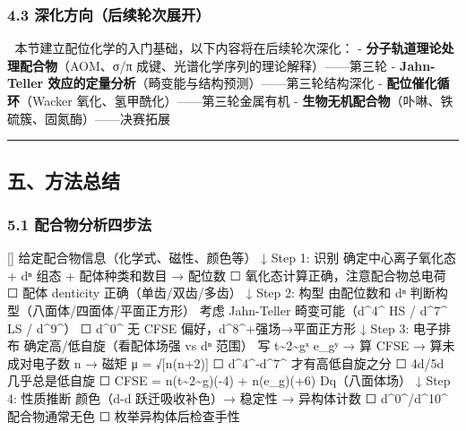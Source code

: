 \documentclass[a4paper,11pt]{ctexart}
\newenvironment{Shaded}{}{}
\newenvironment{Highlighting}{}{}
\newcommand{\NormalTok}[1]{#1}
\begin{document}
\subsubsection{4.3 深化方向（后续轮次展开）}\label{ux6df1ux5316ux65b9ux5411ux540eux7eedux8f6eux6b21ux5c55ux5f00}

🔷 本节建立配位化学的入门基础，以下内容将在后续轮次深化：
- \textbf{分子轨道理论处理配合物}（AOM、σ/π 成键、光谱化学序列的理论解释）------第三轮
- \textbf{Jahn-Teller 效应的定量分析}（畸变能与结构预测）------第三轮结构深化
- \textbf{配位催化循环}（Wacker 氧化、氢甲酰化）------第三轮金属有机
- \textbf{生物无机配合物}（卟啉、铁硫簇、固氮酶）------决赛拓展

\begin{center}\rule{0.5\linewidth}{0.5pt}\end{center}

\subsection{五、方法总结}\label{ux4e94ux65b9ux6cd5ux603bux7ed3}

\subsubsection{5.1 配合物分析四步法}\label{ux914dux5408ux7269ux5206ux6790ux56dbux6b65ux6cd5}

\begin{Shaded}
\begin{Highlighting}[]
\NormalTok{给定配合物信息（化学式、磁性、颜色等）}
\NormalTok{    ↓}
\NormalTok{Step 1: 识别}
\NormalTok{   确定中心离子氧化态 + dⁿ 组态 + 配体种类和数目 → 配位数}
\NormalTok{    ☐ 氧化态计算正确，注意配合物总电荷}
\NormalTok{    ☐ 配体 denticity 正确（单齿/双齿/多齿）}
\NormalTok{    ↓}
\NormalTok{Step 2: 构型}
\NormalTok{   由配位数和 dⁿ 判断构型（八面体/四面体/平面正方形）}
\NormalTok{   考虑 Jahn{-}Teller 畸变可能（d\^{}4\^{} HS / d\^{}7\^{} LS / d\^{}9\^{}）}
\NormalTok{    ☐ d\^{}0\^{} 无 CFSE 偏好，d\^{}8\^{}+强场→平面正方形}
\NormalTok{    ↓}
\NormalTok{Step 3: 电子排布}
\NormalTok{   确定高/低自旋（看配体场强 vs dⁿ 范围）}
\NormalTok{   写 t\textasciitilde{}2\textasciitilde{}gˣ e\_gʸ → 算 CFSE → 算未成对电子数 n → 磁矩 μ = √[n(n+2)]}
\NormalTok{    ☐ d\^{}4\^{}{-}d\^{}7\^{} 才有高低自旋之分}
\NormalTok{    ☐ 4d/5d 几乎总是低自旋}
\NormalTok{    ☐ CFSE = n(t\textasciitilde{}2\textasciitilde{}g)({-}4) + n(e\_g)(+6) Dq（八面体场）}
\NormalTok{    ↓}
\NormalTok{Step 4: 性质推断}
\NormalTok{   颜色（d{-}d 跃迁吸收补色）→ 稳定性 → 异构体计数}
\NormalTok{    ☐ d\^{}0\^{}/d\^{}10\^{} 配合物通常无色}
\NormalTok{    ☐ 枚举异构体后检查手性}
\end{Highlighting}
\end{Shaded}
\end{document}
